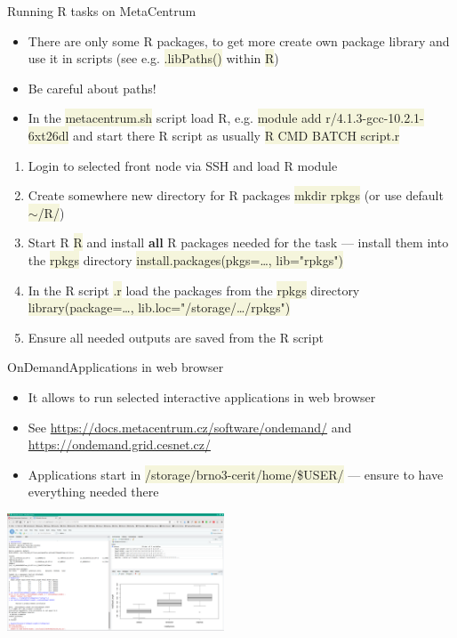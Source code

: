 \documentclass[compress, xelatex, 11pt, xcolor=svgnames, aspectratio=169,
	hyperref={
		bookmarks=true,
		unicode=true,
		colorlinks=true,
		pdftitle={Molecular data in R},
		plainpages=false,
		pdfauthor={Vojtech Zeisek},
		pdfsubject={Course about phylogeny and evolution in R},
		pdfcreator={XeLaTeX},
		pdfkeywords={R, evolution, phylogeny, molecular data},
		linkcolor=Crimson, %
		anchorcolor=Magenta, %
		citecolor=Magenta, %
		filecolor=Magenta, %
		menucolor=Magenta, %
		urlcolor=DodgerBlue, %
		},
	url={hyphens, lowtilde} %
	]{beamer}
\renewcommand{\texttt}[1]{\colorbox{Beige}{{\ttfamily #1}}}
\begin{document}
\begin{frame}{Running R tasks on MetaCentrum}
	\begin{itemize}
		\item There are only some R packages, to get more create own package library and use it in scripts (see e.g. \texttt{.libPaths()} within \texttt{R})
		\item \alert{Be careful about paths!}
		\item In the \texttt{metacentrum.sh} script load R, e.g. \texttt{module add r/4.1.3-gcc-10.2.1-6xt26dl} and start there R script as usually \texttt{R CMD BATCH script.r}
	\end{itemize}
	\begin{enumerate}
		\item Login to selected front node via SSH and load R module
		\item Create somewhere new directory for R packages \texttt{mkdir rpkgs} (or use default \texttt{$\sim$/R/})
		\item Start R \texttt{R} and install \textbf{all} R packages needed for the task --- install them into the \texttt{rpkgs} directory \texttt{install.packages(pkgs=\ldots, lib="rpkgs")}
		\item In the R script \texttt{*.r} load the packages from the \texttt{rpkgs} directory \texttt{library(package=\ldots, lib.loc="/storage/\ldots/rpkgs")}
		\item Ensure all needed outputs are saved from the R script
	\end{enumerate}
\end{frame}

\begin{frame}{OnDemand}{Applications in web browser}
	\begin{itemize}
		\item It allows to run selected interactive applications in web browser
		\item See \url{https://docs.metacentrum.cz/software/ondemand/} and \url{https://ondemand.grid.cesnet.cz/}
		\item Applications start in \texttt{/storage/brno3-cerit/home/\$USER/} --- ensure to have everything needed there
	\end{itemize}
	\begin{center}
		\includegraphics[height=3.5cm]{rstudio_ondemand.png}
	\end{center}
\end{frame}
\end{document}
